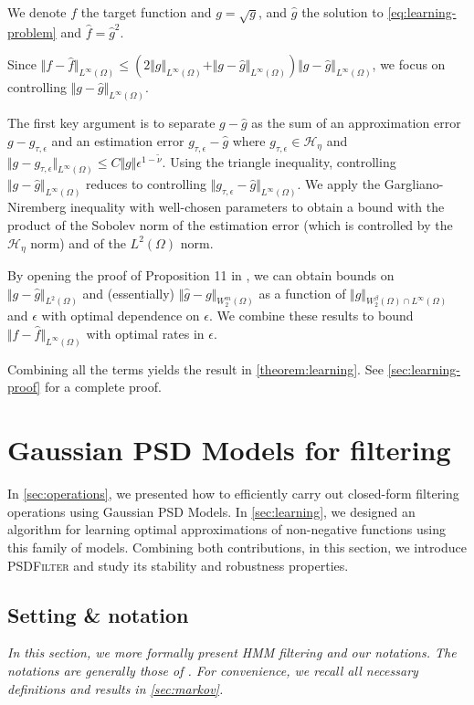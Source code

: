 We denote $f$ the target function and $g = \sqrt{g}$, and $\hat g$ the solution to \cref{eq:learning-problem} and $\hat f = \hat g^2$.

Since $\Vert f - \hat f\Vert_{L^\infty(\Omega)}\leq \left(2\Vert g\Vert_{L^\infty(\Omega)}+ \Vert g - \hat g\Vert_{L^\infty(\Omega)} \right)\Vert g- \hat g\Vert_{L^\infty(\Omega)}$, we focus on controlling $\Vert g - \hat g \Vert_{L^\infty(\Omega)}$.

The first key argument is to separate $g - \hat g$ as the sum of an approximation error $g - g_{\tau, \epsilon}$ and an estimation error $g_{\tau, \epsilon} - \hat g$ where $g_{\tau, \epsilon} \in \mathcal H_\eta$ and $\Vert g - g_{\tau, \epsilon}\Vert_{L^\infty(\Omega)}\leq C \Vert g \Vert \epsilon^{1-\tilde \nu}$. Using the triangle inequality, controlling $\Vert g - \hat g\Vert_{L^\infty(\Omega)}$ reduces to controlling $\Vert g_{\tau, \epsilon} - \hat g\Vert_{L^\infty(\Omega)}$. We apply the Gargliano-Niremberg inequality with well-chosen parameters to obtain a bound with the product of the Sobolev norm of the estimation error (which is controlled by the $\mathcal H_\eta$ norm) and of the $L^2(\Omega)$ norm.

By opening the proof of Proposition 11 in \cite{sampling-ulysse}, we can obtain bounds on $\Vert g - \hat g \Vert_{L^2(\Omega)}$ and (essentially) $\Vert \hat g - g\Vert_{W^m_2(\Omega)}$ as a function of $\Vert g\Vert_{W^\beta_2(\Omega)\cap L^\infty(\Omega)}$ and $\epsilon$ with optimal dependence on $\epsilon$. We combine these results to bound $\Vert f - \hat f\Vert_{L^\infty(\Omega)}$ with optimal rates in $\epsilon$.

Combining all the terms yields the result in \cref{theorem:learning}. See \cref{sec:learning-proof} for a complete proof.

\section{Gaussian PSD Models for filtering}\label{sec:psd-filter-root}
In \cref{sec:operations}, we presented how to efficiently carry out closed-form filtering operations using Gaussian PSD Models. In \cref{sec:learning}, we designed an algorithm for learning optimal approximations of non-negative functions using this family of models. Combining both contributions, in this section, we introduce \textsc{PSDFilter} and study its stability and robustness properties.

\subsection{Setting \& notation}
\emph{In this section, we more formally present HMM filtering and our notations. The notations are generally those of \cite{cappehmm}. For convenience, we recall all necessary definitions and results in \cref{sec:markov}.}



